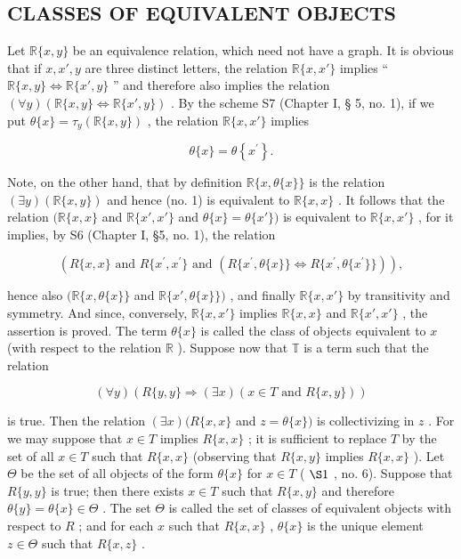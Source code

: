 \subsection{CLASSES OF EQUIVALENT OBJECTS}

Let \(\mathbb{R}\{x, y\}\) be an equivalence relation, which need not have a graph. It is obvious that if \(x, x', y\) are three distinct letters, the relation \(\mathbb{R}\{x, x'\}\) implies `` \(\mathbb{R}\{x, y\} \Longleftrightarrow \mathbb{R}\{x', y\}\) '' and therefore also implies the relation \((\forall y)(\mathbb{R}\{x, y\} \Longleftrightarrow \mathbb{R}\{x', y\})\) . By the scheme S7 (Chapter I, § 5, no. 1), if we put \(\theta\{x\} = \tau_y(\mathbb{R}\{x, y\})\) , the relation \(\mathbb{R}\{x, x'\}\) implies

\[
\theta \{x \} = \theta \left\{x ^ {\prime} \right\}.
\]

Note, on the other hand, that by definition \(\mathbb{R}\{x, \theta\{x\}\}\) is the relation \((\exists y)(\mathbb{R}\{x, y\})\) and hence (no. 1) is equivalent to \(\mathbb{R}\{x, x\}\) . It follows that the relation \((\mathbb{R}\{x, x\}\) and \(\mathbb{R}\{x', x'\}\) and \(\theta\{x\} = \theta\{x'\})\) is equivalent to \(\mathbb{R}\{x, x'\}\) , for it implies, by S6 (Chapter I, §5, no. 1), the relation

\[
(R \{x, x \} \text {   and   } R \{x ^ {\prime}, x ^ {\prime} \} \text {   and   } (R \{x ^ {\prime}, \theta \{x \} \} \iff R \{x ^ {\prime}, \theta \{x ^ {\prime} \} \})),
\]

hence also \((\mathbb{R}\{x, \theta\{x\}\}\) and \(\mathbb{R}\{x', \theta\{x\}\})\) , and finally \(\mathbb{R}\{x, x'\}\) by transitivity and symmetry. And since, conversely, \(\mathbb{R}\{x, x'\}\) implies \(\mathbb{R}\{x, x\}\) and \(\mathbb{R}\{x', x'\}\) , the assertion is proved. The term \(\theta\{x\}\) is called the class of objects equivalent to \(x\) (with respect to the relation \(\mathbb{R}\) ). Suppose now that \(\mathbb{T}\) is a term such that the relation

\[
(\forall y) (R \{y, y \} \Longrightarrow (\exists x) (x \in T \text {   and   } R \{x, y \}))\tag{1}
\]

is true. Then the relation \((\exists x)(R\{x, x\}\) and \(z = \theta\{x\})\) is collectivizing in \(z\) . For we may suppose that \(x \in T\) implies \(R\{x, x\}\) ; it is sufficient to replace \(T\) by the set of all \(x \in T\) such that \(R\{x, x\}\) (observing that \(R\{x, y\}\) implies \(R\{x, x\}\) ). Let \(\Theta\) be the set of all objects of the form \(\theta\{x\}\) for \(x \in T\) ( \(\S 1\) , no. 6). Suppose that \(R\{y, y\}\) is true; then there exists \(x \in T\) such that \(R\{x, y\}\) and therefore \(\theta\{y\} = \theta\{x\} \in \Theta\) . The set \(\Theta\) is called the set of classes of equivalent objects with respect to \(R\) ; and for each \(x\) such that \(R\{x, x\}\) , \(\theta\{x\}\) is the unique element \(z \in \Theta\) such that \(R\{x, z\}\) .

